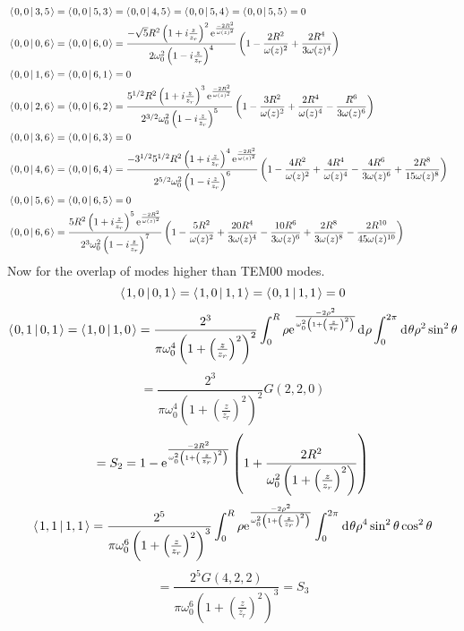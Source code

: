 \documentclass[11pt]{amsart}
\makeatletter
\newcommand{\e}{{\rm e}}				%
\newcommand{\msp}[1]{\mspace{#1mu}}		%
\newcommand{\0}{\varnothing}		%
\newcommand{\dd}{\msp{1} {\rm{d}} \msp{1}}	%
\newcommand{\brac}[2]{\left\langle\msp{2} #1\left\lvert \msp{3.5} #2 \right.\right\rangle}	%
\newcommand{\1}{!}
\newcommand{\2}{@}
\newcommand{\3}{\#}
\newcommand{\4}{\$}
\newcommand{\5}{\%}
\newcommand{\6}{$^\wedge$}
\newcommand{\7}{\&}
\newcommand{\8}{*}
\newcommand{\9}{(}
\makeatother
\begin{document}
\begin{align*}
\\
&
\brac{0,0}{3,5} = \brac{0,0}{5,3} = \brac{0,0}{4,5} = \brac{0,0}{5,4} = \brac{0,0}{5,5} = 0      
\\
&
\brac{0,0}{0,6} = \brac{0,0}{6,0} =   \frac{-\sqrt{5}R^2\left(1+i\frac{z}{z_r}\right)^2\e^{\frac{-2R^2}{\omega(z)^2}}}{2\omega_0^2\left(1-i\frac{z}{z_r}\right)^4}\left(1-\frac{2R^2}{\omega(z)^2}+\frac{2R^4}{3\omega(z)^4}\right) 
\\
&
\brac{0,0}{1,6} = \brac{0,0}{6,1} = 0
\\
&
\brac{0,0}{2,6} = \brac{0,0}{6,2} = \frac{5^{1/2}R^2\left(1+i\frac{z}{z_r}\right)^3\e^{\frac{-2R^2}{\omega(z)^2}}}{2^{3/2}\omega_0^2\left(1-i\frac{z}{z_r}\right)^5}\left(1-\frac{3R^2}{\omega(z)^2}+\frac{2R^4}{\omega(z)^4}-\frac{R^6}{3\omega(z)^6}\right)
\\
&
\brac{0,0}{3,6} = \brac{0,0}{6,3} = 0
\\
&
\brac{0,0}{4,6} = \brac{0,0}{6,4} =\frac{-3^{1/2}5^{1/2}R^2\left(1+i\frac{z}{z_r}\right)^4\e^{\frac{-2R^2}{\omega(z)^2}}}{2^{5/2}\omega_0^2\left(1-i\frac{z}{z_r}\right)^6}\left(1-\frac{4R^2}{\omega(z)^2}+\frac{4R^4}{\omega(z)^4}-\frac{4R^6}{3\omega(z)^6}+\frac{2R^8}{15\omega(z)^8}\right)
\\
&
\brac{0,0}{5,6} = \brac{0,0}{6,5} = 0
\\
&
\brac{0,0}{6,6} = \frac{5R^2\left(1+i\frac{z}{z_r}\right)^5\e^{\frac{-2R^2}{\omega(z)^2}}}{2^3\omega_0^2\left(1-i\frac{z}{z_r}\right)^7}\left(1-\frac{5R^2}{\omega(z)^2}+\frac{20R^4}{3\omega(z)^4}-\frac{10R^6}{3\omega(z)^6}+\frac{2R^8}{3\omega(z)^8}-\frac{2R^{10}}{45\omega(z)^{10}}\right)
\end{align*}
Now for the overlap of modes higher than TEM00 modes.
\[
\brac{1,0}{0,1} = \brac{1,0}{1,1} = \brac{0,1}{1,1}  = 0
\]
\[
\brac{0,1}{0,1} = \brac{1,0}{1,0} = \frac{2^3}{\pi\omega_0^4\left(1+\left(\frac{z}{z_r}\right)^2\right)^2}\int_0^R\rho \e^{\frac{-2\rho^2}{\omega_0^2\left(1+\left(\frac{z}{z_r}\right)^2\right)}}\dd \rho\int_0^{2\pi} \dd \theta \rho^2\sin^2\theta
\]
\[
= \frac{2^3}{\pi\omega_0^4\left(1+\left(\frac{z}{z_r}\right)^2\right)^2}G(2,2,0) 
\]
\[
=S_2 = 1-\e^{\frac{-2R^2}{\omega_0^2\left(1+\left(\frac{z}{z_r}\right)^2\right)}}\left(1+\frac{2R^2}{\omega_0^2\left(1+\left(\frac{z}{z_r}\right)^2\right)}\right)
\]
\[
\brac{1,1}{1,1} = \frac{2^5}{\pi\omega_0^6\left(1+\left(\frac{z}{z_r}\right)^2\right)^3}\int_0^R\rho\e^{\frac{-2\rho^2}{\omega_0^2\left(1+\left(\frac{z}{z_r}\right)^2\right)}}\int_0^{2\pi}\dd \theta \rho^4\sin^2\theta \cos^2\theta
\]
\[
=\frac{2^5G(4,2,2)}{\pi \omega_0^6\left(1+\left(\frac{z}{z_r}\right)^2\right)^3} = S_3
\]
\end{document}
